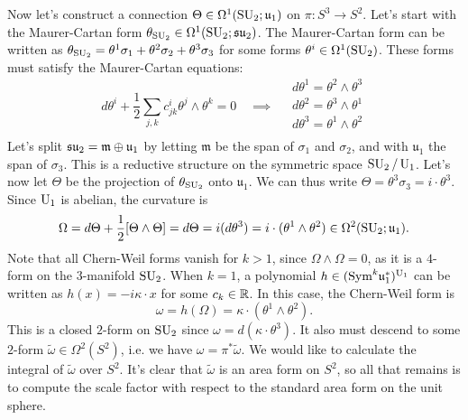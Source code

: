 \documentclass{../../templates/lkx_pset}
\begin{document}
\begin{parts}
	Now let's construct a connection $\Theta\in \Omega^1(\operatorname{SU}_2; \mathfrak{u}_1)$ on $\pi : S^3 \to S^2$. Let's start with the Maurer-Cartan form $\theta_{\operatorname{SU}_2}\in\Omega^1(\operatorname{SU}_2; \mathfrak{su}_2)$. The Maurer-Cartan form can be written as $\theta_{\operatorname{SU}_2} = \theta^1\sigma_1 + \theta^2\sigma_2+\theta^3\sigma_3$ for some forms $\theta^i\in \Omega^1(\operatorname{SU}_2)$. These forms must satisfy the Maurer-Cartan equations:
	\[
		d\theta^i + \frac{1}{2}\sum_{j,k} c^i_{j k} \theta^j\wedge \theta^k = 0 \quad\implies\quad \begin{array}{l}
			d\theta^1 = \theta^2\wedge \theta^3 \\
			d\theta^2 = \theta^3\wedge \theta^1 \\
			d\theta^3 = \theta^1\wedge \theta^2 \\
		\end{array}
	\]
	Let's split $\mathfrak{su}_2 = \mathfrak{m}\oplus \mathfrak{u}_1$ by letting $\mathfrak{m}$ be the span of $\sigma_1$ and $\sigma_2$, and with $\mathfrak{u}_1$ the span of $\sigma_3$. This is a reductive structure on the symmetric space $\operatorname{SU}_2/\operatorname{U}_1$. Let's now let $\Theta$ be the projection of $\theta_{\operatorname{SU}_2}$ onto $\mathfrak{u}_1$. We can thus write $\Theta = \theta^3\sigma_3 = i\cdot \theta^3$. Since $\operatorname{U}_1$ is abelian, the curvature is
	\[
		\Omega = d\Theta + \frac{1}{2}[\Theta\wedge \Theta] = d\Theta = i(d\theta^3) = i\cdot (\theta^1\wedge \theta^2) \in \Omega^2(\operatorname{SU}_2; \mathfrak{u}_1).
	\]
	Note that all Chern-Weil forms vanish for $k>1$, since $\Omega\wedge \Omega=0$, as it is a $4$-form on the $3$-manifold $\operatorname{SU}_2$. When $k=1$, a polynomial $h\in (\textrm{Sym}^k \mathfrak{u}_1^*)^{\operatorname{U}_1}$ can be written as $h(x)=-i\kappa\cdot x$ for some $c_k\in \mathbb{R}$. In this case, the Chern-Weil form is
	\[
		\omega = h(\Omega) = \kappa\cdot(\theta^1\wedge \theta^2).
	\]
	This is a closed $2$-form on $\operatorname{SU}_2$ since $\omega = d(\kappa\cdot \theta^3)$. It also must descend to some $2$-form $\widetilde{\omega}\in \Omega^2(S^2)$, i.e. we have $\omega=\pi^*\widetilde{\omega}$. We would like to calculate the integral of $\widetilde{\omega}$ over $S^2$. It's clear that $\widetilde{\omega}$ is an area form on $S^2$, so all that remains is to compute the scale factor with respect to the standard area form on the unit sphere.


\end{parts}
\end{document}
